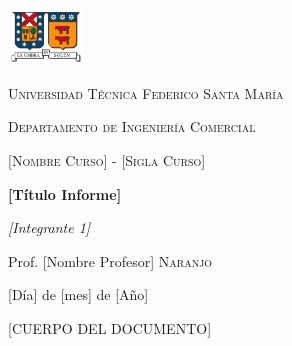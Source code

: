 \documentclass[letterpaper,12pt,oneside]{article}
\begin{document}
{\setlength{\parskip}{5pt} %
\begin{titlepage}
	\centering
	\includegraphics[width=0.15\textwidth]{logo_usm1}\par\vspace{1cm}
	{\scshape\LARGE Universidad Técnica Federico Santa María \par}
	{\scshape\LARGE Departamento de Ingeniería Comercial \par}
	\vspace{0.5cm}
	{\scshape\Large [Nombre Curso] - [Sigla Curso]\par}
	\vspace{0.75cm}
	{\huge\bfseries [Título Informe]\par}
	\vspace{1cm}
	{\Large\itshape [Integrante 1]\par
	[Integrante 2]\par
	[Integrante n]\par}
	\vfill
	Prof. [Nombre Profesor] \textsc{Naranjo}
	\vfill
	{\large [Día] de [mes] de [Año]\par}
\end{titlepage}}

[CUERPO DEL DOCUMENTO]
\end{document}
